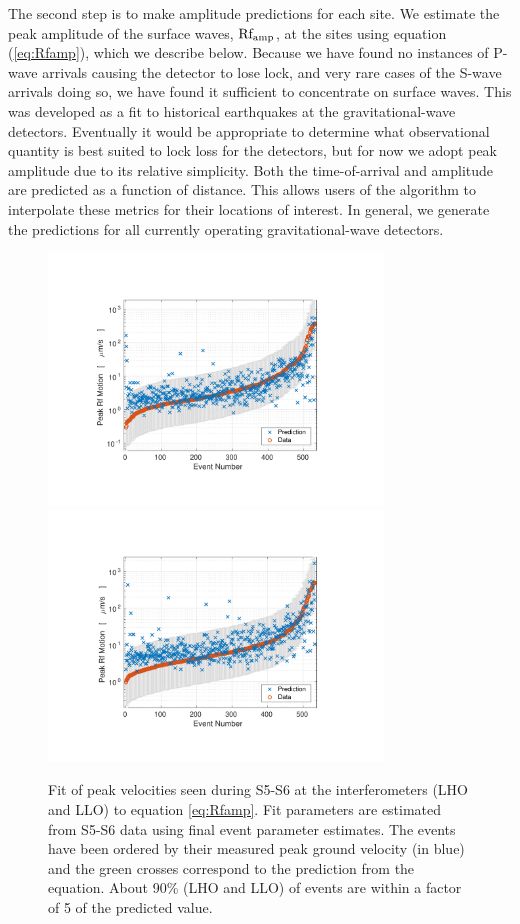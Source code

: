 \documentclass[twocolumn, aps, superscriptaddress]{revtex4}
\begin{document}
The second step is to make amplitude predictions for each site. We estimate the peak amplitude of the surface waves, $\rm Rf_{amp}$, at the sites using equation (\ref{eq:Rfamp}), which we describe below. Because we have found no instances of P-wave arrivals causing the detector to lose lock, and very rare cases of the S-wave arrivals doing so, we have found it sufficient to concentrate on surface waves. This was developed as a fit to historical earthquakes at the gravitational-wave detectors. %
Eventually it would be appropriate to determine what observational quantity is best suited to lock loss for the detectors, but for now we adopt peak amplitude due to its relative simplicity. Both the time-of-arrival and amplitude are predicted as a function of distance. This allows users of the algorithm to interpolate these metrics for their locations of interest. In general, we generate the predictions for all currently operating gravitational-wave detectors.

\begin{figure}[t]
\hspace*{-0.5cm}
 \includegraphics[width=3.5in,trim = 2.5cm 1.5cm 2.5cm 1.5cm, clip=true]{Prediction_LHO_S5_S6.pdf}
 \includegraphics[width=3.5in,trim = 2.5cm 1.5cm 2.5cm 1.5cm, clip=true]{Prediction_LLO_S5_S6.pdf}
 \caption{Fit of peak velocities seen during S5-S6 at the interferometers (LHO and LLO) to equation \ref{eq:Rfamp}.  Fit parameters are estimated from S5-S6 data using final event parameter estimates. The events have been ordered by their measured peak ground velocity (in blue) and the green crosses correspond to the prediction from the equation. About 90\% (LHO and LLO) of events are within a factor of 5 of the predicted value.}
 \label{fig:regression}
\end{figure}
\end{document}

